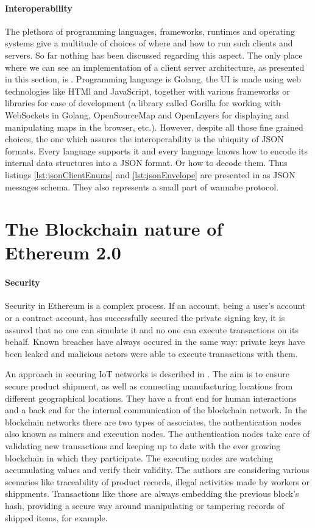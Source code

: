 \documentclass[a4paper,12pt,twoside]{book}
\begin{document}
    \paragraph{Interoperability} The plethora of programming languages, frameworks, runtimes and operating systems give a multitude of choices of where and how to run such clients and servers. So far nothing has been discussed regarding this aspect. The only place where we can see an implementation of a client server architecture, as presented in this section, is \cite{MicroservicesCityTrafficSimulation}. Programming language is Golang, the UI is made using web technologies like HTMl and JavaScript, together with various frameworks or libraries for ease of development (a library called Gorilla for working with WebSockets in Golang, OpenSourceMap and OpenLayers for displaying and manipulating maps in the browser, etc.). However, despite all those fine grained choices, the one which assures the interoperability is the ubiquity of JSON formats. Every language supports it and every language knows how to encode its internal data structures into a JSON format. Or how to decode them. Thus listings \ref{lst:jsonClientEnums} and \ref{lst:jsonEnvelope} are presented in as JSON messages schema. They also represents a small part of wannabe protocol.

\section{The Blockchain nature of Ethereum 2.0}
\label{sec:EthereumNature}

    \paragraph{Security} Security in Ethereum is a complex process. If an account, being a user's account or a contract account, has successfully secured the private signing key, it is assured that no one can simulate it and no one can execute transactions on its behalf. Known breaches have always occured in the same way: private keys have been leaked and malicious actors were able to execute transactions with them.

    An approach in securing IoT networks is described in \cite{SecureCommunicatingThingsNetworkFramework}. The aim is to ensure secure product shipment, as well as connecting manufacturing locations from different geographical locations. They have a front end for human interactions and a back end for the internal communication of the blockchain network. In the blockchain networks there are two types of associates, the authentication nodes also known as miners and execution nodes. The authentication nodes take care of validating new transactions and keeping up to date with the ever growing blockchain in which they participate. The executing nodes are watching accumulating values and verify their validity. The authors are considering various scenarios like traceability of product records, illegal activities made by workers or shippments. Transactions like those are always embedding the previous block's hash, providing a secure way around manipulating or tampering records of shipped items, for example.
\end{document}
